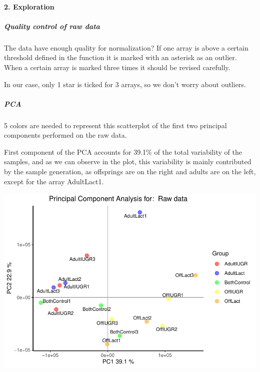 \documentclass[]{article}
\newenvironment{Shaded}{\begin{snugshade}}{\end{snugshade}}
\newcommand{\KeywordTok}[1]{\textcolor[rgb]{0.13,0.29,0.53}{\textbf{#1}}}
\newcommand{\DataTypeTok}[1]{\textcolor[rgb]{0.13,0.29,0.53}{#1}}
\newcommand{\DecValTok}[1]{\textcolor[rgb]{0.00,0.00,0.81}{#1}}
\newcommand{\StringTok}[1]{\textcolor[rgb]{0.31,0.60,0.02}{#1}}
\newcommand{\OtherTok}[1]{\textcolor[rgb]{0.56,0.35,0.01}{#1}}
\newcommand{\OperatorTok}[1]{\textcolor[rgb]{0.81,0.36,0.00}{\textbf{#1}}}
\newcommand{\NormalTok}[1]{#1}
\let\oldparagraph\paragraph
\renewcommand{\paragraph}[1]{\oldparagraph{#1}\mbox{}}
\let\oldsubparagraph\subparagraph
\renewcommand{\subparagraph}[1]{\oldsubparagraph{#1}\mbox{}}
\begin{document}
\paragraph{2. Exploration}\label{exploration}

\subparagraph{Quality control of raw
data}\label{quality-control-of-raw-data}

The data have enough quality for normalization? If one array is above a
certain threshold defined in the function it is marked with an asterisk
as an outlier. When a certain array is marked three times it should be
revised carefully.

In our case, only 1 star is ticked for 3 arrays, so we don't worry about
outliers.

\subparagraph{PCA}\label{pca}

5 colors are needed to represent this scatterplot of the first two
principal components performed on the raw data.

First component of the PCA accounts for 39.1\% of the total variability
of the samples, and as we can observe in the plot, this variability is
mainly contributed by the sample generation, as offsprings are on the
right and adults are on the left, except for the array AdultLact1.

\begin{Shaded}
\end{Shaded}

\includegraphics{delVal_AnaIsabel_ADO_PEC1_files/figure-latex/unnamed-chunk-11-1.pdf}
\end{document}
